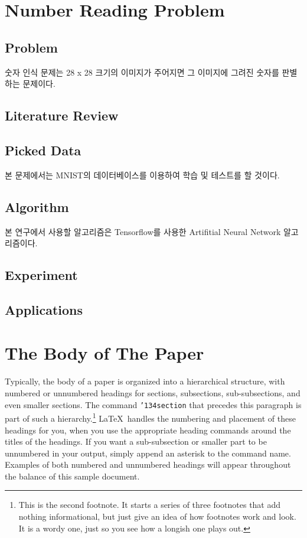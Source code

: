 \documentclass{sig-alternate-05-2015}
\begin{document}
\section{Number Reading Problem}
\begin{CJK}{UTF8}{mj}
\subsection{Problem}
숫자 인식 문제는 28 x 28 크기의 이미지가 주어지면 그 이미지에 그려진 숫자를 판별하는 문제이다.
\subsection{Literature Review}
\subsection{Picked Data}
본 문제에서는 MNIST의 데이터베이스를 이용하여 학습 및 테스트를 할 것이다.
\subsection{Algorithm}
본 연구에서 사용할 알고리즘은 Tensorflow를 사용한 Artifitial Neural Network 알고리즘이다.
\subsection{Experiment}
\subsection{Applications}
\end{CJK}

\section{The {\secit Body} of The Paper}
Typically, the body of a paper is organized
into a hierarchical structure, with numbered or unnumbered
headings for sections, subsections, sub-subsections, and even
smaller sections.  The command \texttt{{\char'134}section} that
precedes this paragraph is part of such a
hierarchy.\footnote{This is the second footnote.  It
starts a series of three footnotes that add nothing
informational, but just give an idea of how footnotes work
and look. It is a wordy one, just so you see
how a longish one plays out.} \LaTeX\ handles the numbering
and placement of these headings for you, when you use
the appropriate heading commands around the titles
of the headings.  If you want a sub-subsection or
smaller part to be unnumbered in your output, simply append an
asterisk to the command name.  Examples of both
numbered and unnumbered headings will appear throughout the
balance of this sample document.
\end{document}
